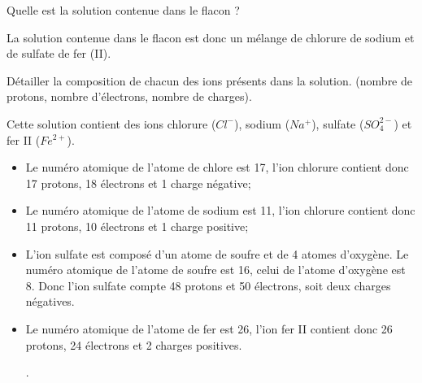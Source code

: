 \begin{questions}
	\question Quelle est la solution contenue dans le flacon ?
	\begin{solution}
		La solution contenue dans le flacon est donc un mélange de chlorure de sodium et de sulfate de fer (II).
	\end{solution}
	
	\question Détailler la composition de chacun des ions présents dans la solution. (nombre de protons, nombre d'électrons, nombre de charges).
	\begin{solution}
		Cette solution contient des ions chlorure ($Cl^-$), sodium ($Na^+$), sulfate ($SO_4^{2-}$) et fer II ($Fe^{2+}$).
		\begin{itemize}
			\item Le numéro atomique de l'atome de chlore est 17, l'ion chlorure contient donc 17 protons, 18 électrons et 1 charge négative;
			
			\item Le numéro atomique de l'atome de sodium est 11, l'ion chlorure contient donc 11 protons, 10 électrons et 1 charge positive;
			
			\item L'ion sulfate est composé d'un atome de soufre et de 4 atomes d'oxygène. Le numéro atomique de l'atome de soufre est 16, celui de l'atome d'oxygène est 8. Donc l'ion sulfate compte 48 protons et 50 électrons, soit deux charges négatives. 
			
			\item Le numéro atomique de l'atome de fer est 26, l'ion fer II contient donc 26 protons, 24 électrons et 2 charges positives.
			
			.
		\end{itemize}
		
		
		
	\end{solution}
	
\end{questions}